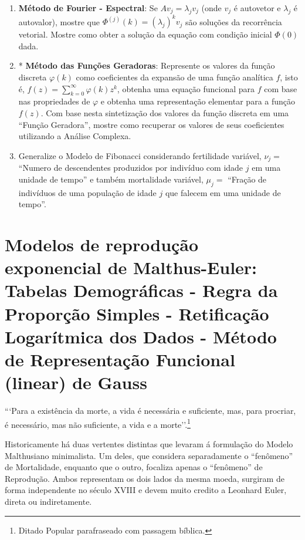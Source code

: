 \begin{exercise}
\begin{enumerate}
    \item \textbf{Método de Fourier - Espectral}: Se \(A v_j = \lambda_j v_j\) (onde \(v_j\) é autovetor e \(\lambda_j\) é autovalor), mostre que \(\Phi^{(j)}(k) = (\lambda_j)^{k} v_j\) são soluções da recorrência vetorial. Mostre como obter a solução da equação com condição inicial \(\Phi(0)\) dada.
    \item* \textbf{Método das Funções Geradoras}: Represente os valores da função discreta \(\varphi(k)\) como coeficientes da expansão de uma função analítica \(f\), isto é, \(f(z) = \displaystyle \sum_{k=0}^{\infty} \varphi(k) z^k\), obtenha uma equação funcional para \(f\) com base nas propriedades de \(\varphi\) e obtenha uma representação elementar para a função \(f(z)\). Com base nesta sintetização dos valores da função discreta em uma ``Função Geradora'', mostre como recuperar os valores de seus coeficientes utilizando a Análise Complexa.
    \item Generalize o Modelo de Fibonacci considerando fertilidade variável, \(\nu_j =\) ``Numero de descendentes produzidos por indivíduo com idade \(j\) em uma unidade de tempo'' e também mortalidade variável, \(\mu_j =\) ``Fração de indivíduos de uma população de idade \(j\) que falecem em uma unidade de tempo''.
\end{enumerate}
\end{exercise}


\section{Modelos de reprodução exponencial de Malthus-Euler: Tabelas Demográficas - Regra da Proporção Simples - Retificação Logarítmica dos Dados - Método de Representação Funcional (linear) de Gauss}
    
    \begin{citacao}
    ```Para a existência da morte, a vida é necessária e suficiente, mas, para procriar, é necessário, mas não suficiente, a vida e a morte''.\footnote{Ditado Popular parafraseado com passagem bíblica.}
    \end{citacao}

    Historicamente há duas vertentes distintas que levaram á formulação do Modelo Malthusiano minimalista. Um deles, que considera separadamente o ``fenômeno'' de Mortalidade, enquanto que o outro, focaliza apenas o ``fenômeno'' de Reprodução. Ambos representam os dois lados da mesma moeda, surgiram de forma independente no século XVIII e devem muito credito a Leonhard Euler, direta ou indiretamente.

